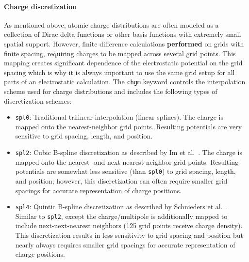 \documentclass[12pt,titlepage]{article}
\newcommand{\keyword}[1]{\texttt{#1}}
\newcommand{\revision}[1]{\color{red} \textbf{#1} \leavevmode\color{black}}
\begin{document}
\paragraph{Charge discretization}
As mentioned above, atomic charge distributions are often modeled as a collection of Dirac delta functions or other basis functions with extremely small spatial support.
However, finite difference calculations \revision{performed} on grids with finite spacing, requiring charges to be mapped across several grid points.
This mapping creates significant dependence of the electrostatic potential on the grid spacing which is why it is always important to use the same grid setup for all parts of an electrostatic calculation.
The \keyword{chgm} keyword controls the interpolation scheme used for charge distributions and includes the following types of discretization schemes:
\begin{itemize}
	\item \keyword{spl0}: Traditional trilinear interpolation (linear splines).
	The charge is mapped onto the nearest-neighbor grid points.
	Resulting potentials are very sensitive to grid spacing, length, and position.
	\item \keyword{spl2}: Cubic B-spline discretization as described by Im et al.~\cite{IBR98}.
	The charge is mapped onto the nearest- and next-nearest-neighbor grid points.
	Resulting potentials are somewhat less sensitive (than \keyword{spl0}) to grid spacing, length, and position; however, this discretization can often require smaller grid spacings for accurate representation of charge positions.
	\item \keyword{spl4}: Quintic B-spline discretization as described by Schnieders et al.~\cite{Schnieders2007}.
	Similar to \keyword{spl2}, except the charge/multipole is additionally mapped to include next-next-nearest neighbors (125 grid points receive charge density).
	This discretization results in less sensitivity to grid spacing and position but nearly always requires smaller grid spacings for accurate representation of charge positions.
\end{itemize}
\end{document}
